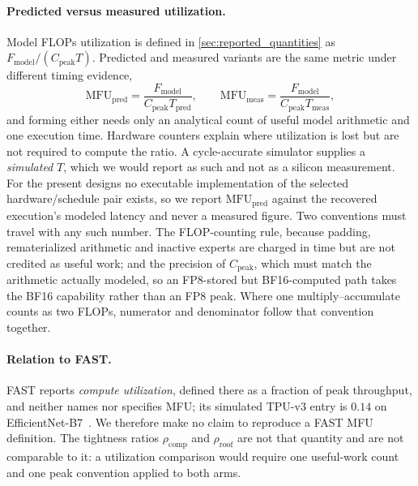 \paragraph{Predicted versus measured utilization.}
Model FLOPs utilization is defined in \cref{sec:reported_quantities} as $F_{\mathrm{model}}/(C_{\mathrm{peak}}T)$.
Predicted and measured variants are the same metric under different timing evidence,
\begin{equation}
    \mathrm{MFU}_{\mathrm{pred}}
    = \frac{F_{\mathrm{model}}}{C_{\mathrm{peak}}T_{\mathrm{pred}}},
    \qquad
    \mathrm{MFU}_{\mathrm{meas}}
    = \frac{F_{\mathrm{model}}}{C_{\mathrm{peak}}T_{\mathrm{meas}}},
    \label{eq:mfu_measured}
\end{equation}
and forming either needs only an analytical count of useful model arithmetic and one execution time.
Hardware counters explain where utilization is lost but are not required to compute the ratio.
A cycle-accurate simulator supplies a \emph{simulated} $T$, which we would report as such and not as a silicon measurement.
For the present designs no executable implementation of the selected hardware/schedule pair exists, so we report $\mathrm{MFU}_{\mathrm{pred}}$ against the recovered execution's modeled latency and never a measured figure.
Two conventions must travel with any such number.
The FLOP-counting rule, because padding, rematerialized arithmetic and inactive experts are charged in time but are not credited as useful work; and the precision of $C_{\mathrm{peak}}$, which must match the arithmetic actually modeled, so an FP8-stored but BF16-computed path takes the BF16 capability rather than an FP8 peak.
Where one multiply--accumulate counts as two FLOPs, numerator and denominator follow that convention together.

\paragraph{Relation to FAST.}
FAST reports \emph{compute utilization}, defined there as a fraction of peak throughput, and neither names nor specifies MFU; its simulated TPU-v3 entry is $0.14$ on EfficientNet-B7~\citep{zhang_fast}.
We therefore make no claim to reproduce a FAST MFU definition.
The tightness ratios $\rho_{\mathrm{comp}}$ and $\rho_{\mathrm{roof}}$ are not that quantity and are not comparable to it: a utilization comparison would require one useful-work count and one peak convention applied to both arms.

